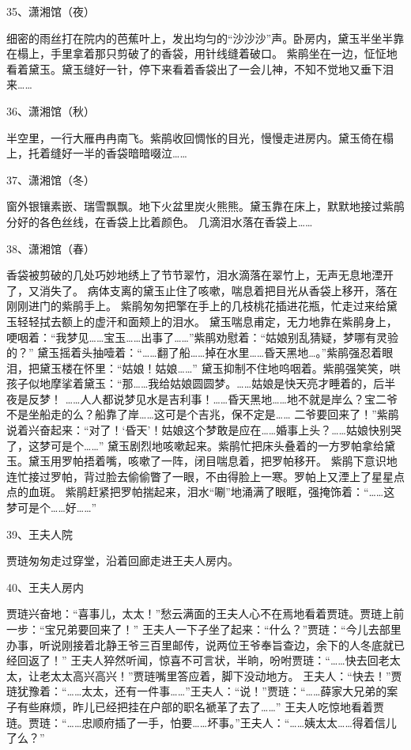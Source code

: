 35、潇湘馆（夜）\par 
细密的雨丝打在院内的芭蕉叶上，发出均匀的“沙沙沙”声。卧房内，黛玉半坐半靠在榻上，手里拿着那只剪破了的香袋，用针线缝着破口。 
紫鹃坐在一边，怔怔地看着黛玉。黛玉缝好一针，停下来看着香袋出了一会儿神，不知不觉地又垂下泪来…… 

36、潇湘馆（秋）\par 
半空里，一行大雁冉冉南飞。紫鹃收回惆怅的目光，慢慢走进房内。黛玉倚在榻上，托着缝好一半的香袋暗暗啜泣…… 

37、潇湘馆（冬）\par
窗外银镶素嵌、瑞雪飘飘。地下火盆里炭火熊熊。黛玉靠在床上，默默地接过紫鹃分好的各色丝线，在香袋上比着颜色。 几滴泪水落在香袋上…… 

38、潇湘馆（春）\par
香袋被剪破的几处巧妙地绣上了节节翠竹，泪水滴落在翠竹上，无声无息地湮开了，又消失了。
病体支离的黛玉止住了咳嗽，喘息着把目光从香袋上移开，落在刚刚进门的紫鹃手上。
紫鹃匆匆把擎在手上的几枝桃花插进花瓶，忙走过来给黛玉轻轻拭去额上的虚汗和面颊上的泪水。 
黛玉喘息甫定，无力地靠在紫鹃身上，哽咽着：“我梦见……宝玉……出事了……”紫鹃劝慰着：“姑娘别乱猜疑，梦哪有灵验的？” 
黛玉摇着头抽噎着：“……翻了船……掉在水里……昏天黑地…。”紫鹃强忍着眼泪，把黛玉楼在怀里：“姑娘！姑娘……” 
黛玉抑制不住地呜咽着。紫鹃强笑笑，哄孩子似地摩挲着黛玉：“那……我给姑娘圆圆梦。……姑娘是快天亮才睡着的，后半夜是反梦！
……人人都说梦见水是吉利事！……昏天黑地……地不就是岸么？宝二爷不是坐船走的么？船靠了岸……这可是个吉兆，保不定是……
二爷要回来了！”紫鹃说着兴奋起来：“对了！‘昏天’！姑娘这个梦敢是应在……婚事上头？……姑娘快别哭了，这梦可是个……”
黛玉剧烈地咳嗽起来。紫鹃忙把床头叠着的一方罗帕拿给黛玉。黛玉用罗帕捂着嘴，咳嗽了一阵，闭目喘息着，把罗帕移开。 
紫鹃下意识地连忙接过罗帕，背过脸去偷偷瞥了一眼，不由得脸上一寒。罗帕上又湮上了星星点点的血斑。 
紫鹃赶紧把罗帕揣起来，泪水“唰”地涌满了眼眶，强掩饰着：“……这梦可是个……好……” 

39、王夫人院\par

贾琏匆匆走过穿堂，沿着回廊走进王夫人房内。 

40、王夫人房内\par 

贾琏兴奋地：“喜事儿，太太！”愁云满面的王夫人心不在焉地看着贾琏。贾琏上前一步：“宝兄弟要回来了！” 
王夫人一下子坐了起来：“什么？”贾琏：“今儿去部里办事，听说刚接着北静王爷三百里邮传，说两位王爷奉旨查边，余下的人冬底就已经回返了！” 
王夫人猝然听闻，惊喜不可言状，半晌，吩咐贾琏：“……快去回老太太，让老太太高兴高兴！”贾琏嘴里答应着，脚下没动地方。 
王夫人：“快去！”贾琏犹豫着：“……太太，还有一件事……”王夫人：“说！”贾琏：“……薛家大兄弟的案子有些麻烦，昨儿已经把挂在户部的职名褫革了去了……” 
王夫人吃惊地看着贾琏。贾琏：“……忠顺府插了一手，怕要……坏事。”王夫人：“……姨太太……得着信儿了么？” 

